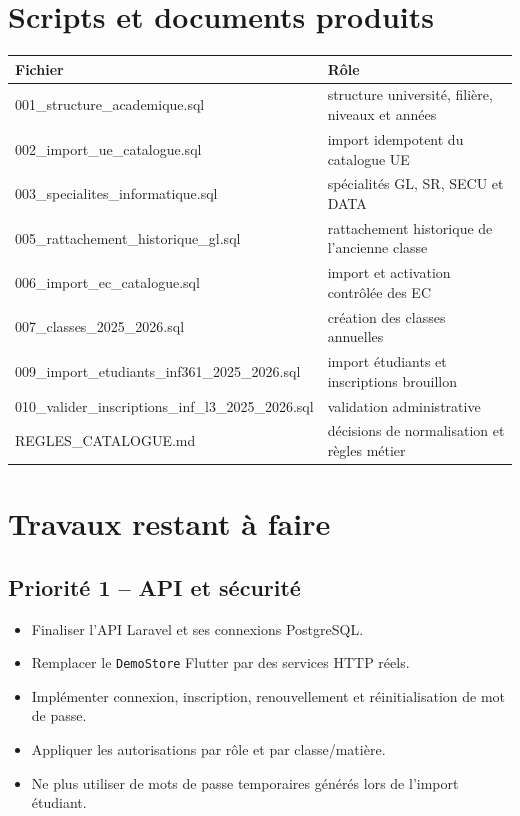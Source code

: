 \documentclass[11pt,a4paper]{article}
\begin{document}
\section{Scripts et documents produits}
\begin{tabular}{p{}p{}}
Fichier & Rôle\\\hline
001\_structure\_academique.sql & structure université, filière, niveaux et années\\
002\_import\_ue\_catalogue.sql & import idempotent du catalogue UE\\
003\_specialites\_informatique.sql & spécialités GL, SR, SECU et DATA\\
005\_rattachement\_historique\_gl.sql & rattachement historique de l'ancienne classe\\
006\_import\_ec\_catalogue.sql & import et activation contrôlée des EC\\
007\_classes\_2025\_2026.sql & création des classes annuelles\\
009\_import\_etudiants\_inf361\_2025\_2026.sql & import étudiants et inscriptions brouillon\\
010\_valider\_inscriptions\_inf\_l3\_2025\_2026.sql & validation administrative\\
REGLES\_CATALOGUE.md & décisions de normalisation et règles métier\\
\end{tabular}

\section{Travaux restant à faire}
\subsection{Priorité 1 -- API et sécurité}
\begin{itemize}
  \item Finaliser l'API Laravel et ses connexions PostgreSQL.
  \item Remplacer le \texttt{DemoStore} Flutter par des services HTTP réels.
  \item Implémenter connexion, inscription, renouvellement et réinitialisation de mot de passe.
  \item Appliquer les autorisations par rôle et par classe/matière.
  \item Ne plus utiliser de mots de passe temporaires générés lors de l'import étudiant.
\end{itemize}
\end{document}

